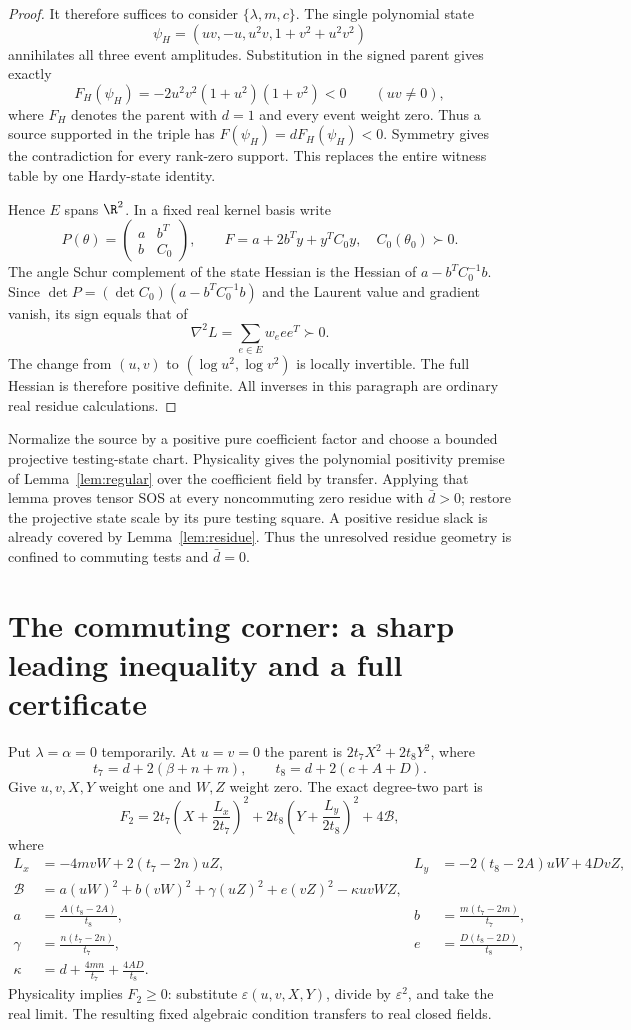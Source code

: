 \begin{proof}
It therefore suffices to consider $\{\lambda,m,c\}$. The single polynomial state
\[
\psi_H=(uv,-u,u^2v,1+v^2+u^2v^2)
\]
annihilates all three event amplitudes. Substitution in the signed parent gives exactly
\[
F_H(\psi_H)=-2u^2v^2(1+u^2)(1+v^2)<0\qquad(uv\ne0),
\]
where $F_H$ denotes the parent with $d=1$ and every event weight zero. Thus a source supported in the triple has $F(\psi_H)=dF_H(\psi_H)<0$. Symmetry gives the contradiction for every rank-zero support. This replaces the entire witness table by one Hardy-state identity.

Hence $E$ spans $\R^2$. In a fixed real kernel basis write
\[
P(\theta)=\begin{pmatrix}a&b^T\\b&C_0\end{pmatrix},\qquad
F=a+2b^Ty+y^TC_0y,\quad C_0(\theta_0)\succ0.
\]
The angle Schur complement of the state Hessian is the Hessian of $a-b^TC_0^{-1}b$. Since $\det P=(\det C_0)(a-b^TC_0^{-1}b)$ and the Laurent value and gradient vanish, its sign equals that of
\[
\nabla^2L=\sum_{e\in E}w_e ee^T\succ0.
\]
The change from $(u,v)$ to $(\log u^2,\log v^2)$ is locally invertible. The full Hessian is therefore positive definite. All inverses in this paragraph are ordinary real residue calculations.
\end{proof}

Normalize the source by a positive pure coefficient factor and choose a bounded projective testing-state chart. Physicality gives the polynomial positivity premise of Lemma~\ref{lem:regular} over the coefficient field by transfer. Applying that lemma proves tensor SOS at every noncommuting zero residue with $\bar d>0$; restore the projective state scale by its pure testing square. A positive residue slack is already covered by Lemma~\ref{lem:residue}. Thus the unresolved residue geometry is confined to commuting tests and $\bar d=0$.

\section{The commuting corner: a sharp leading inequality and a full certificate}\label{sec:corner}
Put $\lambda=\alpha=0$ temporarily. At $u=v=0$ the parent is $2t_7X^2+2t_8Y^2$, where
\[
t_7=d+2(\beta+n+m),\qquad t_8=d+2(c+A+D).
\]
Give $u,v,X,Y$ weight one and $W,Z$ weight zero. The exact degree-two part is
\[
F_2=2t_7\left(X+\frac{L_x}{2t_7}\right)^2
+2t_8\left(Y+\frac{L_y}{2t_8}\right)^2+4\mathcal B,
\]
where
\begin{align*}
L_x&=-4mvW+2(t_7-2n)uZ,&
L_y&=-2(t_8-2A)uW+4DvZ,\\
\mathcal B&=a(uW)^2+b(vW)^2+\gamma(uZ)^2+e(vZ)^2-\kappa uvWZ,\\
a&=\frac{A(t_8-2A)}{t_8},&b&=\frac{m(t_7-2m)}{t_7},\\
\gamma&=\frac{n(t_7-2n)}{t_7},&e&=\frac{D(t_8-2D)}{t_8},\\
\kappa&=d+\frac{4mn}{t_7}+\frac{4AD}{t_8}.&&
\end{align*}
Physicality implies $F_2\ge0$: substitute $\varepsilon(u,v,X,Y)$, divide by $\varepsilon^2$, and take the real limit. The resulting fixed algebraic condition transfers to real closed fields.

